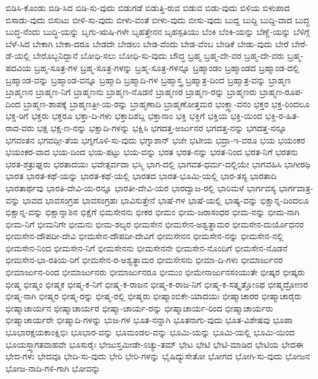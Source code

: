 {ಬಿಡಿಸಿ-ಕೊಂಡು
ಬಿಡಿ-ಸಿದ
ಬಿಡಿ-ಸು-ವುದು
ಬಿಡುಗಡೆ
ಬಿಡುತ್ತಿ-ರುವ
ಬಿಡುವ
ಬಿಡು-ವುದು
ಬಿಳಿಯ
ಬಿಳುಪಾದ
ಬಿಸಾಡು-ವುದು
ಬಿಸುಟು
ಬೀಳಿ-ಸು-ವುದು
ಬೀಳು-ವಂತೆ
ಬೀಳು-ವುದು
ಬೀಸು-ವುದು
ಬುದ್ದ
ಬುದ್ದಿ
ಬುದ್ದಿ-ವಾದ
ಬುದ್ಧ
ಬುದ್ಧ-ನೆಂದು
ಬುದ್ಧಿ-ಯನ್ನು
ಬೃಗು-ಋಷಿ-ಗಳೇ
ಬೃಹತ್ತೇನನ
ಬೃಹಸ್ಪತಿಯು
ಬೆಂಕಿ
ಬೆಂಕಿ-ಯನ್ನು
ಬೆಣ್ಣೆ-ಯನ್ನು
ಬೆಳಿಗ್ಗೆ
ಬೆಳೆ-ಸಿದ
ಬೇಕಾಗಿ
ಬೇಕಾ-ದರೂ
ಬೇಡದೇ
ಬೇಡಲು
ಬೇಡ-ವೆಂದು
ಬೇಡ-ವೆಂಬ
ಬೇಡಿಕೆ
ಬೇಡು-ವುದು
ಬೇರೆ
ಬೇರೆ-ಡೆ-ಯಲ್ಲಿ
ಬೇರೊಬ್ಬನಿದ್ದಾನೆ
ಬೋಧಿ-ಸಲು
ಬೋಧಿ-ಸು-ವುದು
ಬೌದ್ಧ
ಬ್ರಹ್ಮ
ಬ್ರಹ್ಮ-ದೇ-ವರ
ಬ್ರಹ್ಮ-ದೇ-ವರು
ಬ್ರಹ್ಮ-ಪದವಿಯ
ಬ್ರಹ್ಮ-ಸೂತ್ರ-ಗಳ
ಬ್ರಹ್ಮ-ಸೂತ್ರ-ಗಳನ್ನು
ಬ್ರಹ್ಮ-ಸೂತ್ರ-ಗಳನ್ನೂ
ಬ್ರಹ್ಮಾಂಡಂ
ಬ್ರಹ್ಮಾಂಡದ
ಬ್ರಹ್ಮಾಂಡ-ದಲ್ಲಿ
ಬ್ರಹ್ಮಾಂಡ-ವನ್ನು
ಬ್ರಹ್ಮಾಂಡ-ವನ್ನೂ
ಬ್ರಹ್ಮಾದಿ
ಬ್ರಹ್ಮಾದಿ-ಗಳ
ಬ್ರಹ್ಮಾಸ್ತ್ರ
ಬ್ರಹ್ಮಾತ್ರ-ದಿಂದ
ಬ್ರಹ್ಮಾತ್ರ-ವನ್ನು
ಬ್ರಾಹ್ಮಣ
ಬ್ರಾಹ್ಮಣನ
ಬ್ರಾಹ್ಮಣ-ನಿಗೆ
ಬ್ರಾಹ್ಮಣನು
ಬ್ರಾಹ್ಮಣ-ನೊಡನೆ
ಬ್ರಾಹ್ಮಣರ
ಬ್ರಾಹ್ಮಣ-ರನ್ನು
ಬ್ರಾಹ್ಮಣರು
ಬ್ರಾಹ್ಮಣ-ರೂಪ-ದಿಂದ
ಬ್ರಾಹ್ಮಣ-ಶಾಪಕ್ಕೆ
ಬ್ರಾಹ್ಮಣತ್ರೀ-ಯ-ರನ್ನು
ಬ್ರಾಹ್ಮಣಾದಿ
ಬ್ರಾಹ್ಮಣೋತ್ತಮರ
ಭಂಕ್ತ್ವಾ-ವನಂ
ಭಕ್ತರ
ಭಕ್ತ-ರಿಂದಲೂ
ಭಕ್ತ-ರಿಗೆ
ಭಕ್ತರು
ಭಕ್ತರೂ
ಭಕ್ತಾ-ದಿ-ಗಳು
ಭಕ್ತಾದಿಶಬ್ದ
ಭಕ್ತಾನಾಂ
ಭಕ್ತಿ
ಭಕ್ತಿಗೆ
ಭಕ್ತಿಯ
ಭಕ್ತಿ-ಯಿಂದ
ಭಕ್ತಿ-ರ-ಹಿತ-ರಾದ-ವರು
ಭಕ್ಷ
ಭಕ್ಷ-ಣ-ನನ್ನು
ಭಕ್ಷಾದಿ-ಗಳನ್ನು
ಭಕ್ಷಿಸಿ
ಭಗದತ್ತ-ಅರ್ಜುನರ
ಭಗದತ್ತ-ನನ್ನು
ಭಗದತ್ತ-ನನ್ನೂ
ಭಗವಂತನ
ಭಗವದ್ಗೀ-ತೆಯ
ಭಗ್ನಗೊಳಿ-ಸು-ವುದು
ಭಗ್ನಾಶಾನ್
ಭಜೇ
ಭಟೀಯ
ಭದ್ರಾ-ಇ-ವರೂ
ಭಯ
ಭಯಂಕರ
ಭಯಂಕರ-ವಾದ
ಭಯ-ದಿಂದ
ಭಯ-ಪಟ್ಟು
ಭಯ-ವನ್ನು
ಭರತ
ಭರತ-ನನ್ನು
ಭರತ-ನಿಂದ
ಭರತ-ನಿಗೆ
ಭರತನು
ಭರತ-ಶತ್ರುಘ್ನರು
ಭರತಾದಯಃ
ಭವೇತ್ಸರ್ವದಾ
ಭಸ್ಮಿ
ಭಾಗ-ದಲ್ಲಿ
ಭಾಗವತ-ಧರ್ಮ-ದಲ್ಲಿಯೇ
ಭಾಗವಹಿಸಿ
ಭಾಗೀರಥಿ
ಭಾರತ
ಭಾರತ-ಕಥೆ-ಯನ್ನು
ಭಾರತ-ಕಥೆ-ಯಲ್ಲಿ
ಭಾರತದ
ಭಾರತ-ಭೂಮಿ-ಯಲ್ಲಿ
ಭಾರ-ತಸ್ಯ
ಭಾರತಾದಿ
ಭಾರತಾರ್ಥವು
ಭಾರತಿ-ದೇವಿ-ಯ-ರನ್ನೂ
ಭಾರತೀ-ದೇವಿ-ಯರ
ಭಾರದ್ವಾಜ-ರಲ್ಲಿ
ಭಾರಿಮಳೆ
ಭಾರ್ಗವಸ್ಯ
ಭಾರ್ಗವಾತ್ರ-ವನ್ನು
ಭಾವದ
ಭಾವಸಂಗ್ರಹ
ಭಾವಸಂಗ್ರಹಃ
ಭಾವಿಸುತ್ತೇನೆ
ಭಾಷೆ-ಗಳ
ಭಾಷೆ-ಯಲ್ಲಿ
ಭಾಷ್ಯ-ವನ್ನು
ಭಿಕ್ಷಾನ್ನ-ದಿಂದಲೂ
ಭಿಕ್ಷಾನ್ನ-ವನ್ನು
ಭಿಕ್ಷಾನ್ನಾಶಿನ
ಭಿಕ್ಷೆಗೆ
ಭಿಮಸೇನನು
ಭೀಕರ
ಭೀಮಂ
ಭೀಮ-ಜರಾಸಂಧರ
ಭೀಮ-ನನ್ನು
ಭೀಮ-ನಾಗಿ
ಭೀಮ-ನಿಗೆ
ಭೀಮನಿಗೇ
ಭೀಮನು
ಭೀಮ-ಶಲ್ಯರ
ಭೀಮಸೇನ
ಭೀಮಸೇನ-ಅಶ್ವತ್ಥಾಮರ
ಭೀಮಸೇನ-ದುರ್ಯೊಧನರ
ಭೀಮಸೇನ-ದೌಪದೀ-ದೇವಿ
ಭೀಮಸೇನ-ದೌಪದೀ-ದೇವಿಗೆ
ಭೀಮಸೇನನ
ಭೀಮಸೇನ-ನನ್ನು
ಭೀಮಸೇನ-ನಲ್ಲಿ
ಭೀಮಸೇನ-ನಿಂದ
ಭೀಮಸೇನ-ನಿಗೆ
ಭೀಮಸೇನನು
ಭೀಮಸೇನನೇ
ಭೀಮಸೇನ-ನೊಂದಿಗೆ
ಭೀಮಸೇನ-ನೊಡನೆ
ಭೀಮಸೇನ-ಭಾ-ರತಿಯ-ರಿಗೆ
ಭೀಮಸೇನ-ರ-ಅಶ್ವತ್ಥಾಮರ
ಭೀಮಸೇಸನು
ಭೀಮಾ-ದಿ-ಗಳು
ಭೀಮಾರ್ಜುನರ
ಭೀಮಾರ್ಜುನ-ರಿಂದ
ಭೀಮಾರ್ಜುನರು
ಭೀಮಾರ್ಜುನರೂ
ಭೀಮುಂ
ಭೀಮೇನಾರ್ಜುನಸಂಯುತೇ
ಭೀಷ್ಕರ
ಭೀಷ್ಕರು
ಭೀಷ್ಮ
ಭೀಷ್ಮಂ
ಭೀಷ್ಮಕ
ಭೀಷ್ಮ-ಕ-ನಿಗೆ
ಭೀಷ್ಮ-ಕ-ರಾಜನ
ಭೀಷ್ಮ-ಕ-ರಾಜ-ನಿಗೆ
ಭೀಷ್ಮ-ಕ-ಸತ್ಕೃತ್ತೋಽಥ
ಭೀಷ್ಮದ್ರೋಣರ
ಭೀಷ್ಮ-ನಾಗಿ
ಭೀಷ್ಮರ
ಭೀಷ್ಮ-ರನ್ನು
ಭೀಷ್ಮ-ರಲ್ಲಿ
ಭೀಷ್ಮರು
ಭೀಷ್ಮಾಂಬಿಕೇ-ಯಾದಯಃ
ಭೀಷ್ಮಾಚಾರರ
ಭೀಷ್ಮಾಚಾರೈರು
ಭೀಷ್ಮಾಚಾರ್ಯನ
ಭೀಷ್ಮಾಚಾರ್ಯರ
ಭೀಷ್ಮಾ-ಚಾರ್ಯ-ರನ್ನು
ಭೀಷ್ಮಾಚಾರ್ಯ-ರಿಂದ
ಭೀಷ್ಮಾಚಾರ್ಯರು
ಭೀಷ್ಮಾಚಾರ್ಯರೇ
ಭೀಷ್ಮಾದಿ-ಗಳನ್ನು
ಭುಜ-ಗಳ
ಭೂತ-ನನ್ನಾಗಿ
ಭೂತನಾಗು-ವುದು
ಭೂತ-ವಿಶೇಷವು
ಭೂಪಾ
ಭೂಭಾರಕ್ಷಯಕಾಂಕ್ಷಿಭಿಃ
ಭೂಭಾರ-ವನ್ನು
ಭೂಮಂಡಲ-ವನ್ನು
ಭೂಮಿ-ಯನ್ನು
ಭೂಮಿ-ಯಲ್ಲಿ
ಭೂಮಿ-ಯಿಂದ
ಭೂಯಸ್ತ್ವಾಗತವಾಹವೇ
ಭೂಸುರೈಃ
ಭೇಜುಸ್ತಮೀಡೇ-ಽಚ್ಯು-ತಮ್
ಭೇಟ
ಭೇಟಿ
ಭೇಟಿ-ಮಾಡಿದ
ಭೇಟಿಯ
ಭೇದಈ
ಭೇದ-ಗಳು
ಭೇದವೂ
ಭೇದಿ-ಸು-ವುದು
ಭೇರಿ
ಭೇರಿ-ಗಳನ್ನು
ಭೈಷಿದ್ಯುಸೇತೋ
ಭೋಗದ
ಭೋಗಿ-ಸು-ವುದು
ಭೋಜನ
ಭೋಜ-ನಾದಿ-ಗಳಿ-ಗಾಗಿ
ಭೋವನ್ನು
}

